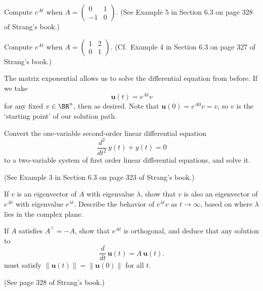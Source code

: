 \documentclass[10pt]{amsart}
\theoremstyle{mythm}
\theoremstyle{definition}
\theoremstyle{myrmk}
\begin{document}
	 Compute $e^{At}$ when $A = \begin{pmatrix}
	0 & 1 \\ -1 & 0 
	\end{pmatrix}$. (See Example 5 in Section 6.3 on page 328 of Strang's book.) 
	
	 Compute $e^{At}$ when $A = \begin{pmatrix}
	1 & 2 \\ 0 & 1 
	\end{pmatrix}$. (Cf.\ Example 4 in Section 6.3 on page 327 of Strang's book.) 
	
	The matrix exponential allows us to solve the differential equation from before. If we take 
	\[
		\bm{u}(t) = e^{At} v
	\]
	for any fixed $v \in \BR^n$, then 
	as desired. Note that $\bm{u}(0) = e^{A0} v = v$, so $v$ is the `starting point' of our solution path. 
	
	 Convert the one-variable second-order linear differential equation 
	\[
		\frac{d^2}{dt^2} \, y(t) + y(t) = 0
	\]
	to a two-variable system of first order linear differential equations, and solve it. 
	
	(See Example 3 in Section 6.3 on page 323 of Strang's book.) 
	
	 If $v$ is an eigenvector of $A$ with eigenvalue $\lambda$, show that $v$ is also an eigenvector of $e^{At}$ with eigenvalue $e^{\lambda t}$. Describe the behavior of $e^{\lambda t} v$ as $t \to \infty$, based on where $\lambda$ lies in the complex plane. 
	
	 If $A$ satisfies $A^\top = -A$, show that $e^{At}$ is orthogonal, and deduce that any solution to 
	\[
	\frac{d}{dt} \, \bm{u}(t) = A\, \bm{u}(t). 
	\]
	must satisfy $\lVert \bm{u}(t) \rVert = \lVert \bm{u}(0) \rVert$ for all $t$. 
	
	(See page 328 of Strang's book.) 
	
	
	
	
	
	
	
	
	
	
	
\end{document}
